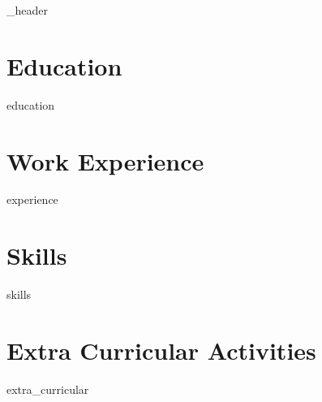 \documentclass[letter,10pt]{article}
\author{Ali Azak}
\begin{document}
{_header}
\vspace*{10pt}

\section{Education}
{education}
\vspace*{10pt}

\section{Work Experience}
{experience}
\vspace*{10pt}

\section{Skills}
\vspace*{3pt}
{skills}
\vspace*{10pt}

\section{Extra Curricular Activities}
\vspace*{3pt}
{extra_curricular}
\vspace*{10pt}
\end{document}
